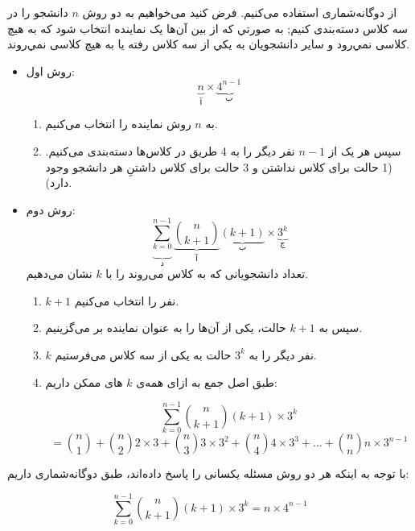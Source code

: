 \p
از دوگانه‌شماری استفاده می‌کنیم.
فرض کنید می‌خواهیم به دو روش  
 $n$ 
 دانشجو را در سه کلاس دسته‌بندی کنیم; 
 به صورتي كه از بین آن‌ها یک نماینده انتخاب شود که به هیچ کلاسی نمي‌رود و 
 ساير دانشجویان به يكي از سه كلاس رفته يا به هيچ کلاسی نمي‌روند.
\begin{itemize}
\item 
  روش اول:
  \[\underbrace{n}_{\text{آ}}\times\underbrace{4^{n-1}}_{\text{ب}}\] 
  
  \begin{enumerate}
    \item  
    
    به 
    $n$ 
    روش نماینده را انتخاب می‌کنیم.
    
    \item 
    
    سپس هر یک از 
    $n-1$ 
  نفر دیگر را به 4 طریق در کلاس‌ها دسته‌بندی می‌کنیم. 
    (1 حالت برای کلاس نداشتن و 3 حالت برای کلاس داشتنِ هر دانشجو وجود دارد).
  \end{enumerate}

\item 
 روش دوم:
   \[\underbrace{\sum\limits_{k=0}^{n-1}}_{\text{د}}\underbrace{\binom{n}{k+1}}_{\text{آ}}\underbrace{(k+1)}_{\text{ب}}\times\underbrace{3^{k}}_{\text{ج}}\] 
    تعداد دانشجویانی که به کلاس می‌روند را با 
    $k$ نشان می‌دهیم.
    \begin{enumerate}
    \item
    
    $k+1$
    نفر را انتخاب می‌کنیم.
    \item
    
    سپس به 
     $k+1$
    حالت، یکی از آن‌ها را به عنوان نماینده بر می‌گزینیم.
    \item
    
    $k$
    نفر دیگر را به
     $3^{k}$ 
    حالت به یکی از سه کلاس می‌فرستیم.
    \item
    
     طبق اصل جمع به ازای همه‌ی 
     $k$
     های ممکن داریم:    
    
     $$\sum\limits_{k=0}^{n-1}\binom{n}{k+1}(k+1)\times3^{k}$$
     $$= \binom{n}{1} + \binom{n}{2} 2\times3 + \binom{n}{3} 3\times3^2 +\binom{n}{4} 4\times3^3 +\ldots +\binom{n}{n} n\times3^{n-1}$$ 
    \end{enumerate}
\end{itemize}
\p
با توجه به اینکه هر دو روش مسئله یکسانی را پاسخ داده‌اند، طبق دوگانه‌شماری داریم:

$$\sum\limits_{k=0}^{n-1}\binom{n}{k+1}(k+1)\times3^{k} = n\times4^{n-1}$$
